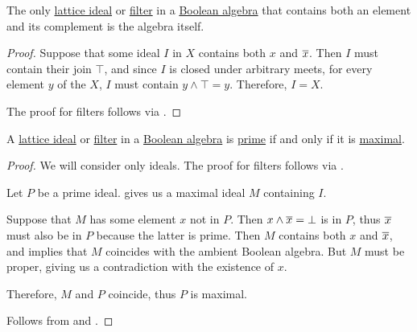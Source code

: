 \begin{proposition}\label{thm:improper_boolean_ideal}
  The only \hyperref[def:lattice_ideal]{lattice ideal} or \hyperref[def:lattice_ideal]{filter} in a \hyperref[def:boolean_algebra]{Boolean algebra} that contains both an element and its complement is the algebra itself.
\end{proposition}
\begin{proof}
  Suppose that some ideal \( I \) in \( X \) contains both \( x \) and \( \oline x \). Then \( I \) must contain their join \( \top \), and since \( I \) is closed under arbitrary meets, for every element \( y \) of the \( X \), \( I \) must contain \( y \wedge \top = y \). Therefore, \( I = X \).

  The proof for filters follows via .
\end{proof}

\begin{proposition}\label{thm:boolean_prime_iff_maximal}
  A \hyperref[def:lattice_ideal]{lattice ideal} or \hyperref[def:lattice_ideal]{filter} in a \hyperref[def:boolean_algebra]{Boolean algebra} is \hyperref[def:lattice_ideal/prime]{prime} if and only if it is \hyperref[def:lattice_ideal/maximal]{maximal}.
\end{proposition}
\begin{proof}
  We will consider only ideals. The proof for filters follows via .

  \SufficiencySubProof Let \( P \) be a prime ideal.  gives us a maximal ideal \( M \) containing \( I \).

  Suppose that \( M \) has some element \( x \) not in \( P \). Then \( x \wedge \oline x = \bot \) is in \( P \), thus \( \oline x \) must also be in \( P \) because the latter is prime. Then \( M \) contains both \( x \) and \( \oline x \), and  implies that \( M \) coincides with the ambient Boolean algebra. But \( M \) must be proper, giving us a contradiction with the existence of \( x \).

  Therefore, \( M \) and \( P \) coincide, thus \( P \) is maximal.

  \NecessitySubProof Follows from  and .
\end{proof}

